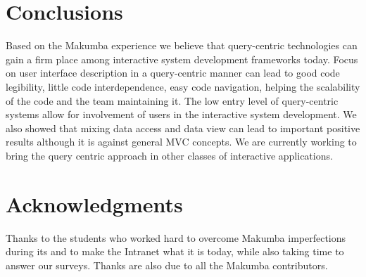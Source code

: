 \documentclass{chi2009}
\begin{document}



\section{Conclusions}\label{sec:conclusions}
Based on the Makumba experience we believe that query-centric technologies can gain a firm place among interactive system development frameworks today. Focus on  user interface description in a query-centric manner can lead to good  code legibility, little code interdependence, easy code navigation,  helping the scalability of the code and the team maintaining it. The low entry level of query-centric systems allow for involvement of users in the interactive system development.  We also showed that mixing data access and data view can lead to important positive results although it is against general MVC concepts. We are currently working to bring the query centric approach in other classes of interactive applications.

\section{Acknowledgments}\label{sec:acknowledgments}
Thanks to the students who worked hard to overcome Makumba imperfections during its  and to make the Intranet what it is today, while also taking time to answer our surveys.  Thanks are also due to all the Makumba contributors. 




\end{document}
